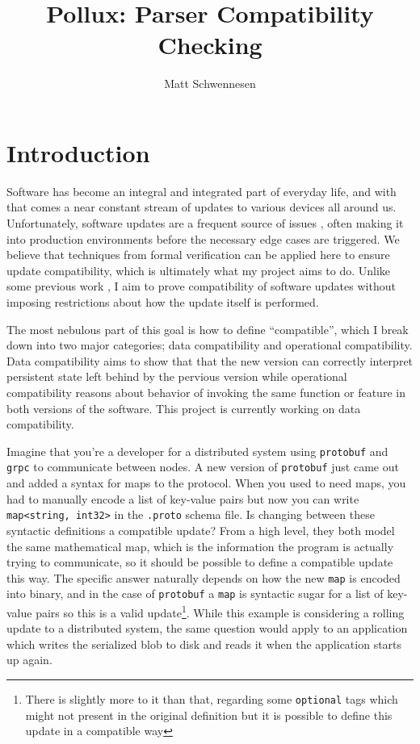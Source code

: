 \documentclass[11pt]{article}
\author{Matt Schwennesen}
\title{Pollux: Parser Compatibility Checking}
\date{}
\theoremstyle{definition}
\theoremstyle{plain}
\begin{document}
\maketitle
\tableofcontents

\section{Introduction}

Software has become an integral and integrated part of everyday life, and with
that comes a near constant stream of updates to various devices all around
us. Unfortunately, software updates are a frequent source of issues
\autocites{zhangUnderstandingDetectingSoftware2021}[][]{Gray1986WhyDC}, often
making it into production environments before the necessary edge cases are
triggered. We believe that techniques from formal verification can be applied
here to ensure update compatibility, which is ultimately what my project aims to
do. Unlike some previous work
\autocites{ajmaniModularSoftwareUpgrades2006}[][]{reitblattAbstractionsNetworkUpdate2012},
I aim to prove compatibility of software updates without imposing restrictions
about how the update itself is performed.

The most nebulous part of this goal is how to define ``compatible'', which I
break down into two major categories; data compatibility and operational
compatibility. Data compatibility aims to show that that the new version can
correctly interpret persistent state left behind by the pervious version while
operational compatibility reasons about behavior of invoking the same function
or feature in both versions of the software. This project is currently working
on data compatibility.

Imagine that you're a developer for a distributed system using \texttt{protobuf}
and \texttt{grpc} to communicate between nodes. A new version of
\texttt{protobuf} just came out and added a syntax for maps to the
protocol. When you used to need maps, you had to manually encode a list of
key-value pairs but now you can write \texttt{map<string, int32>} in the
\texttt{.proto} schema file. Is changing between these syntactic definitions a
compatible update? From a high level, they both model the same mathematical map,
which is the information the program is actually trying to communicate, so it
should be possible to define a compatible update this way. The specific answer
naturally depends on how the new \texttt{map} is encoded into binary, and in the
case of \texttt{protobuf} a \texttt{map} is syntactic sugar for a list of
key-value pairs so this is a valid update\footnote{There is slightly more to it
	than that, regarding some \texttt{optional} tags which might not present in
	the original definition but it is possible to define this update in a
	compatible way}. While this example is considering a rolling update to a
distributed system, the same question would apply to an application which writes
the serialized blob to disk and reads it when the application starts up again.
\end{document}
